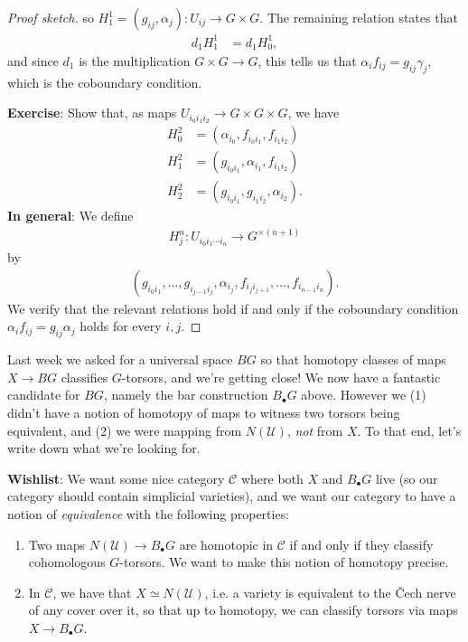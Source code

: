 \documentclass[11pt,openany]{book}
\begin{document}
\begin{proof}[Proof sketch]
so $H^1_1 = (g_{ij},\alpha_j) \colon U_{ij} \to G \times G$. The remaining relation states that
\begin{align*}
    d_1 H_1^1 &= d_1 H_0^1,
\end{align*}
and since $d_1$ is the multiplication $G \times G \to G$, this tells us that $\alpha_i f_{ij} = g_{ij}\gamma_j$, which is the coboundary condition.

\textbf{Exercise}: Show that, as maps $U_{i_0 i_1 i_2} \to G \times G \times G$, we have
\begin{align*}
    H_0^2 &= \left( \alpha_{i_0}, f_{i_0 i_1}, f_{i_1 i_2} \right) \\
    H_1^2 &= \left( g_{i_0 i_1}, \alpha_{i_1}, f_{i_1 i_2} \right) \\
    H_2^2 &= \left( g_{i_0 i_1}, g_{i_1 i_2}, \alpha_{i_2} \right).
\end{align*}
%
\textbf{In general}: We define
\begin{align*}
    H^n_j \colon U_{i_0 i_1 \cdots i_n} \to G^{\times (n+1)}
\end{align*}
by
\begin{align*}
    \left(g_{i_0 i_1}, \ldots, g_{i_{j-1} i_j},\alpha_{i_j}, f_{i_j i_{j+1}}, \ldots, f_{i_{n-1} i_n} \right).
\end{align*}
We verify that the relevant relations hold if and only if the coboundary condition $\alpha_i f_{ij} = g_{ij} \alpha_j$ holds for every $i,j$.
%
\end{proof}

\begin{motivation} 
Last week we asked for a universal space $BG$ so that homotopy classes of maps $X \to BG$ classifies $G$-torsors, and we're getting close! We now have a fantastic candidate for $BG$, namely the bar construction $B_\bullet G$ above. However we (1) didn't have a notion of homotopy of maps to witness two torsors being equivalent, and (2) we were mapping from $N(\mathcal{U})$, \textit{not} from $X$. To that end, let's write down what we're looking for.
\end{motivation}

\textbf{Wishlist}: We want some nice category $\mathscr{C}$ where both $X$ and $B_\bullet G$ live (so our category should contain simplicial varieties), and we want our category to have a notion of \textit{equivalence} with the following properties:
\begin{enumerate}
    \item Two maps $N(\mathcal{U}) \to B_\bullet G$ are homotopic in $\mathscr{C}$ if and only if they classify cohomologous $G$-torsors. We want to make this notion of homotopy precise.
    \item In $\mathscr{C}$, we have that $X \simeq N(\mathcal{U})$, i.e. a variety is equivalent to the \v{C}ech nerve of any cover over it, so that up to homotopy, we can classify torsors via maps $X \to B_\bullet G$.
\end{enumerate}
\end{document}
